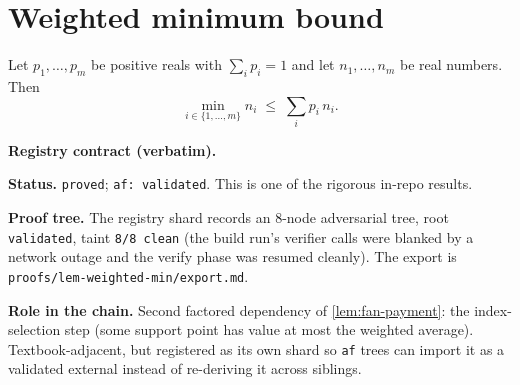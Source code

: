 \section{Weighted minimum bound}\label{sec:weighted-min}

\begin{lemma}\label{lem:weighted-min}
Let $p_1,\dots,p_m$ be positive reals with $\sum_i p_i=1$ and let
$n_1,\dots,n_m$ be real numbers. Then
\[
  \min_{i\in\{1,\dots,m\}} n_i\;\le\;\sum_i p_i\,n_i.
\]
\end{lemma}

\noindent\textbf{Registry contract (verbatim).}

\noindent\textbf{Status.} \texttt{proved}; \texttt{af: validated}.
This is one of the rigorous in-repo results.

\noindent\textbf{Proof tree.} The registry shard records an 8-node
adversarial tree, root \texttt{validated}, taint \texttt{8/8 clean}
(the build run's verifier calls were blanked by a network outage and
the verify phase was resumed cleanly).  The export is
\texttt{proofs/lem-weighted-min/export.md}.

\noindent\textbf{Role in the chain.} Second factored dependency of
\ref{lem:fan-payment}: the index-selection step (some support point
has value at most the weighted average).  Textbook-adjacent, but
registered as its own shard so \texttt{af} trees can import it as a
validated external instead of re-deriving it across siblings.
